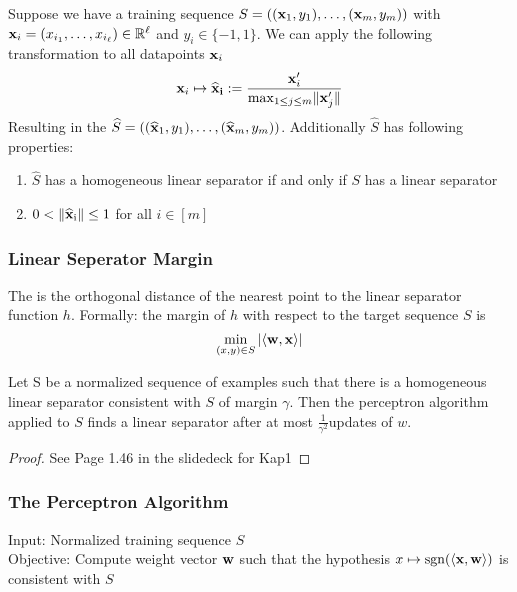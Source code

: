Suppose we have a training sequence $S=((\mathbf{x}_1, y_1), \ldots,(\mathbf{x}_{m}, y_{m}))$ with $\mathbf{x}_{i}=(x_{i_1}, \ldots, x_{i_\ell}) \in \mathbb{R}^\ell$ and $y_{i} \in\{-1,1\}$. We can apply the following transformation to all datapoints $\mathbf{x}_i$
\begin{equation}
\mathbf{x}_{i} \mapsto \widehat{\mathbf{x}}_{\mathbf{i}} :=\frac{\mathbf{x}_{i}^{\prime}}{\max _{1 \leq j \leq m}\lVert\mathbf{x}_{j}^{\prime}\rVert}
\end{equation}
Resulting in the  $\widehat{S}=((\widehat{\mathbf{x}}_{1}, y_{1}), \ldots,(\widehat{\mathbf{x}}_{m}, y_{m}))$. Additionally $\widehat{S}$ has following properties: 
\begin{enumerate}
	\item $\widehat{S}$ has a homogeneous linear separator if and only if $S$ has a linear separator
	\item $0 < \lVert\widehat{\mathbf{x}}_{\mathrm{i}}\rVert \leq 1 $ for all $ i \in [m]$
\end{enumerate}
\subsubsection{Linear Seperator Margin}
The  is the orthogonal distance of the nearest point to the linear separator function $h$. Formally: the margin of $h$ with respect to the target sequence $S$ is
\begin{equation}
\min_{(x, y) \in S}|\langle\mathbf{w}, \mathbf{x}\rangle|
\end{equation} 
\begin{theorem}{}
	Let S  be a normalized sequence of examples such that there is a homogeneous linear separator consistent with $S$ of margin $\gamma$. Then the perceptron algorithm applied to $S$ finds a linear separator after at most $\frac{1}{\gamma^2}$updates of $w$.
\end{theorem}
\begin{proof}{}
	See Page 1.46 in the slidedeck for Kap1
\end{proof}
\subsubsection{The Perceptron Algorithm}
Input: Normalized training sequence $S$\\
Objective: Compute weight vector $\mathbf{w}$ such that the hypothesis $x \mapsto \operatorname{sgn}(\langle\mathbf{x},\mathbf{w}\rangle)$ is consistent with $S$

